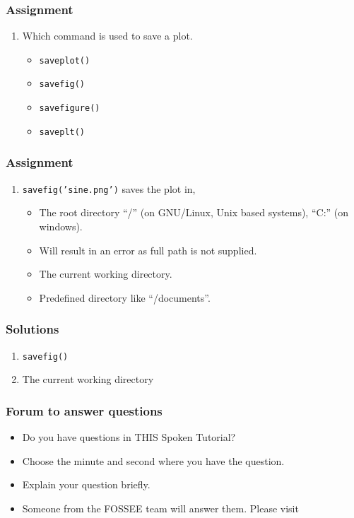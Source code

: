 \documentclass[17pt]{beamer}
\newcounter{saveenumi}
\newcommand{\seti}{\setcounter{saveenumi}{\value{enumi}}}
\newcommand{\conti}{\setcounter{enumi}{\value{saveenumi}}}
\begin{document}
\begin{frame}
\frametitle{Assignment}
\label{sec-11}
\begin{enumerate}
\item Which command is used to save a plot.
	\begin{itemize}
	\item \texttt{saveplot()}
	\item \texttt{savefig()}
	\item \texttt{savefigure()}
	\item \texttt{saveplt()}
	\end{itemize}
	\seti
\end{enumerate}
\end{frame}
\begin{frame}
\frametitle{Assignment}
\begin{enumerate}
\conti
\item \texttt{savefig('sine.png')} saves the plot in,
\begin{itemize}
\item The root directory ``/'' (on GNU/Linux, Unix based systems),
``C:'' (on windows).
\item Will result in an error as full path is not supplied.
\item The current working directory.
\item Predefined directory like ``/documents''.
\end{itemize}
\end{enumerate}
\end{frame}
\begin{frame}
\frametitle{Solutions}
\label{sec-12}
\begin{enumerate}
\item \texttt{savefig()}
\item The current working directory
\end{enumerate}
\end{frame}
\begin{frame}
\frametitle{Forum to answer questions}
\begin{itemize}
\item Do you have questions in THIS Spoken Tutorial?
\item Choose the minute and second where you have the question.
\item Explain your question briefly.
\item Someone from the FOSSEE team will answer them. Please visit 
\end{itemize}
\begin{center}
{\color{blue}{http://forums.spoken-tutorial.org/}}
 \end{center} 
\end{frame}
\end{document}
